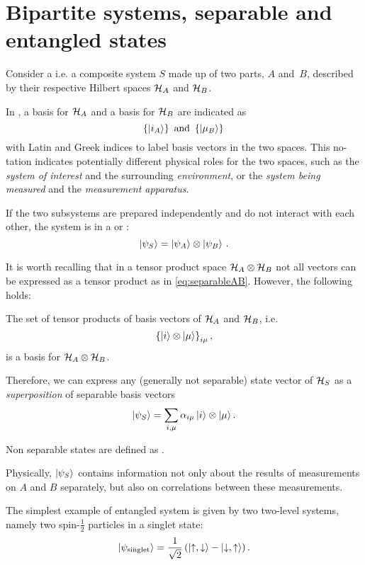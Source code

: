 \section{Bipartite systems, separable and entangled states}

Consider a 
i.e. a composite system $S$
made up of two parts, $A$ and~$B$,
described by their respective Hilbert spaces
$\mathcal{H}_A$ and $\mathcal{H}_B$.

In \cite{Haroche_Exploring},
a basis for $\mathcal{H}_A$ and a basis for $\mathcal{H}_B$
are indicated as
$$
  \left\{\ket{i_A}\right\} \text{ and } \left\{\ket{\mu_B}\right\}\,
$$
with Latin and Greek indices to label basis vectors in the two spaces.
This no-\\tation %
in\-di\-cates potentially different physical roles for the two spaces,
such as the \emph{system of interest} and the surrounding \emph{environment},
or the \emph{system being measured} and the \emph{measurement apparatus}.

If the two subsystems are prepared independently and do not interact with each other,
the system is in a  or :
\begin{equation}\label{eq:separableAB}
  \ket{\psi_S} = \ket{\psi_A}\otimes\ket{\psi_B} \,\text{.}
\end{equation}

It is worth recalling that in a tensor product space $\mathcal{H}_A\otimes\mathcal{H}_B$
not all vectors can be expressed as a tensor product as in \eqref{eq:separableAB}.
However, the following holds:

\begin{proposition}\label{TensorBase}
The set of tensor products of basis vectors of $\mathcal{H}_A$ and $\mathcal{H}_B$,
i.e. $$\left\{\ket{i} \otimes \ket{\mu}\right\}_{i\mu},$$
is a basis for $\mathcal{H}_A \otimes \mathcal{H}_B$.
\end{proposition}
Therefore, we can express any
(generally not separable) state vector of $\mathcal{H}_S$
as a \emph{superposition} of separable basis vectors
\begin{equation}\label{eq:bipartite_expansion}
  \ket{\psi_S} = \sum_{i, \mu}\alpha_{i\mu}\ket{i}\otimes\ket{\mu} \text{.}
\end{equation}

\begin{definition}
  Non separable states are defined as .
\end{definition}

Physically,
$\ket{\psi_S}$ contains information
not only about the results of measurements on $A$ and $B$ separately,
but also on correlations between these measurements.

The simplest example of entangled system is given by two two-level systems,
namely two spin-$\frac{1}{2}$ particles in a singlet state:
\[
  \ket{\psi_{\text{singlet}}} = \frac{1}{\sqrt{2}} \left(\ket{\uparrow, \downarrow} - \ket{\downarrow, \uparrow}\right).
\]
